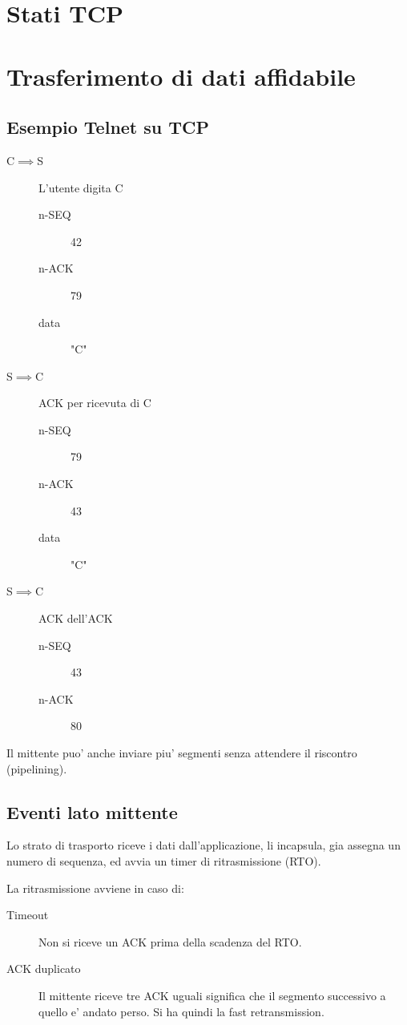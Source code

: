 \section{Stati TCP}
\section{Trasferimento di dati affidabile}
\subsection{Esempio Telnet su TCP}
\begin{description}
    \item[C$\implies$S] L'utente digita C
    \begin{description}
        \item[n-SEQ] 42
        \item[n-ACK] 79
        \item[data] "C"   
    \end{description}
    \item[S$\implies$C] ACK per ricevuta di C
    \begin{description}
        \item[n-SEQ] 79
        \item[n-ACK] 43
        \item[data] "C"   
    \end{description}
    \item[S$\implies$C] ACK dell'ACK
    \begin{description}
        \item[n-SEQ] 43
        \item[n-ACK] 80
    \end{description}
\end{description}
Il mittente puo' anche inviare piu' segmenti senza attendere il riscontro (pipelining).
\subsection{Eventi lato mittente}
Lo strato di trasporto riceve i dati dall'applicazione, li incapsula, gia assegna un numero di sequenza, ed avvia un timer di ritrasmissione (RTO).

La ritrasmissione avviene in caso di:
\begin{description}
    \item[Timeout] Non si riceve un ACK prima della scadenza del RTO.
    \item[ACK duplicato] Il mittente riceve tre ACK uguali significa che il segmento successivo a quello e' andato perso. Si ha quindi la {\color{blue}fast retransmission}.  
\end{description}
